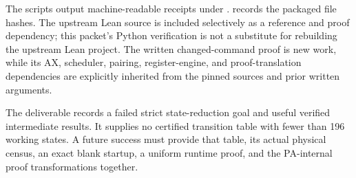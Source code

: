 \documentclass[11pt,a4paper]{article}
\begin{document}
The scripts output machine-readable receipts under .
 records the packaged file hashes. The upstream Lean
source is included selectively as a reference and proof dependency; this
packet's Python verification is not a substitute for rebuilding the
upstream Lean project. The written changed-command proof is new work,
while its AX, scheduler, pairing, register-engine, and proof-translation
dependencies are explicitly inherited from the pinned sources and prior
written arguments.

The deliverable records a failed strict state-reduction goal and useful
verified intermediate results. It supplies no certified transition table
with fewer than 196 working states. A future success must provide that
table, its actual physical census, an exact blank startup, a uniform
runtime proof, and the PA-internal proof transformations together.

\appendix
\clearpage
\end{document}
